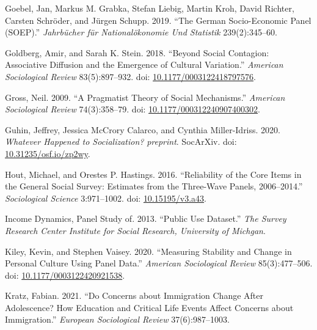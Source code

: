 \documentclass[
  12pt,
]{article}
\newlength{\cslhangindent}
\newlength{\cslentryspacingunit} %
\newenvironment{CSLReferences}[2] %
 {%
  \setlength{\parindent}{0pt}
  \ifodd #1
  \let\oldpar\par
  \def\par{\hangindent=\cslhangindent\oldpar}
  \fi
  \setlength{\parskip}{#2\cslentryspacingunit}
 }%
 {}
\begin{document}
\begin{CSLReferences}{1}{0}
\leavevmode{}%
Goebel, Jan, Markus M. Grabka, Stefan Liebig, Martin Kroh, David
Richter, Carsten Schröder, and Jürgen Schupp. 2019. {``The German
Socio-Economic Panel (SOEP).''} \emph{Jahrb{ü}cher f{ü}r
National{ö}konomie Und Statistik} 239(2):345--60.

\leavevmode{}%
Goldberg, Amir, and Sarah K. Stein. 2018. {``Beyond {Social}
{Contagion}: {Associative} {Diffusion} and the {Emergence} of {Cultural}
{Variation}.''} \emph{American Sociological Review} 83(5):897--932. doi:
\href{https://doi.org/10.1177/0003122418797576}{10.1177/0003122418797576}.

\leavevmode{}%
Gross, Neil. 2009. {``A {Pragmatist} {Theory} of {Social}
{Mechanisms}.''} \emph{American Sociological Review} 74(3):358--79. doi:
\href{https://doi.org/10.1177/000312240907400302}{10.1177/000312240907400302}.

\leavevmode{}%
Guhin, Jeffrey, Jessica McCrory Calarco, and Cynthia Miller-Idriss.
2020. \emph{Whatever {Happened} to {Socialization}?} \emph{preprint}.
SocArXiv. doi:
\href{https://doi.org/10.31235/osf.io/zp2wy}{10.31235/osf.io/zp2wy}.

\leavevmode{}%
Hout, Michael, and Orestes P. Hastings. 2016. {``Reliability of the
{Core} {Items} in the {General} {Social} {Survey}: {Estimates} from the
{Three}-{Wave} {Panels}, 2006--2014.''} \emph{Sociological Science}
3:971--1002. doi:
\href{https://doi.org/10.15195/v3.a43}{10.15195/v3.a43}.

\leavevmode{}%
Income Dynamics, Panel Study of. 2013. {``Public Use Dataset.''}
\emph{The Survey Research Center Institute for Social Research,
University of Michgan}.

\leavevmode{}%
Kiley, Kevin, and Stephen Vaisey. 2020. {``Measuring {Stability} and
{Change} in {Personal} {Culture} {Using} {Panel} {Data}.''}
\emph{American Sociological Review} 85(3):477--506. doi:
\href{https://doi.org/10.1177/0003122420921538}{10.1177/0003122420921538}.

\leavevmode{}%
Kratz, Fabian. 2021. {``Do Concerns about Immigration Change After
Adolescence? How Education and Critical Life Events Affect Concerns
about Immigration.''} \emph{European Sociological Review}
37(6):987--1003.


\end{CSLReferences}
\end{document}
